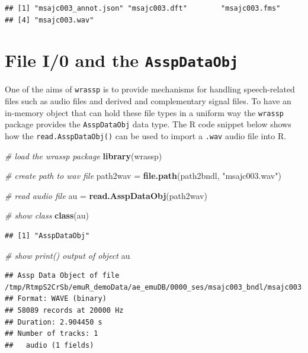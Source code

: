 \documentclass[]{book}
\newenvironment{Shaded}{\begin{snugshade}}{\end{snugshade}}
\newcommand{\CommentTok}[1]{\textcolor[rgb]{0.56,0.35,0.01}{\textit{#1}}}
\newcommand{\KeywordTok}[1]{\textcolor[rgb]{0.13,0.29,0.53}{\textbf{#1}}}
\newcommand{\NormalTok}[1]{#1}
\newcommand{\StringTok}[1]{\textcolor[rgb]{0.31,0.60,0.02}{#1}}
\begin{document}
\begin{verbatim}
## [1] "msajc003_annot.json" "msajc003.dft"        "msajc003.fms"       
## [4] "msajc003.wav"
\end{verbatim}

\hypertarget{file-i0-and-the-asspdataobj}{%
\section{\texorpdfstring{File I/0 and the \texttt{AsspDataObj}}{File I/0 and the AsspDataObj}}\label{file-i0-and-the-asspdataobj}}

One of the aims of \texttt{wrassp} is to provide mechanisms for handling speech-related files such as audio files and derived and complementary signal files. To have an in-memory object that can hold these file types in a uniform way the \texttt{wrassp} package provides the \texttt{AsspDataObj} data type. The R code snippet below shows how the \texttt{read.AsspDataObj()} can be used to import a \texttt{.wav} audio file into R.

\begin{Shaded}
\begin{Highlighting}[]
\CommentTok{# load the wrassp package}
\KeywordTok{library}\NormalTok{(wrassp)}

\CommentTok{# create path to wav file}
\NormalTok{path2wav =}\StringTok{ }\KeywordTok{file.path}\NormalTok{(path2bndl, }\StringTok{"msajc003.wav"}\NormalTok{)}

\CommentTok{# read audio file}
\NormalTok{au =}\StringTok{ }\KeywordTok{read.AsspDataObj}\NormalTok{(path2wav)}

\CommentTok{# show class}
\KeywordTok{class}\NormalTok{(au)}
\end{Highlighting}
\end{Shaded}

\begin{verbatim}
## [1] "AsspDataObj"
\end{verbatim}

\begin{Shaded}
\begin{Highlighting}[]
\CommentTok{# show print() output of object}
\NormalTok{au}
\end{Highlighting}
\end{Shaded}

\begin{verbatim}
## Assp Data Object of file /tmp/RtmpS2CrSb/emuR_demoData/ae_emuDB/0000_ses/msajc003_bndl/msajc003.wav.
## Format: WAVE (binary)
## 58089 records at 20000 Hz
## Duration: 2.904450 s
## Number of tracks: 1 
##   audio (1 fields)
\end{verbatim}
\end{document}

